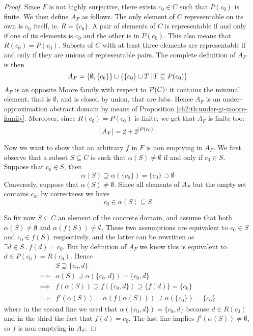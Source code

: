 \begin{proof}
	Since $F$ is not highly surjective, there exists $c_0 \in C$ such that $P(c_0)$ is finite. We then define $A_F$ as follows.
	The only element of $C$ representable on its own is $c_0$ itself, ie. $R = \{ c_0 \}$.
	A pair of elements of $C$ is representable if and only if one of its elements is $c_0$ and the other is in $P(c_0)$. This also means that $R(c_0) = P(c_0)$.
	Subsets of $C$ with at least three elements are representable if and only if they are unions of representable pairs.
	The complete definition of $A_F$ is then
	\[
	A_F = \{ \emptyset, \{ c_0 \} \} \cup \{ \{ c_0 \} \cup T \,\vert\, T \subseteq P(c_0) \}
	\]
	$A_F$ is an opposite Moore family with respect to $\mathcal{P}(C)$: it contains the minimal element, that is $\emptyset$, and is closed by union, that are lubs. Hence $A_F$ is an under-approximation abstract domain by means of Proposition \ref{ch2:th:under-gi-moore-family}.
	Moreover, since $R(c_0) = P(c_0)$ is finite, we get that $A_F$ is finite too:
	\[
	\lvert A_F\rvert = 2 + 2^{\lvert P(c_0)\rvert}
	\]

	Now we want to show that an arbitrary $f$ in $F$ is non emptying in $A_F$.
	We first observe that a subset $S \subseteq C$ is such that $\alpha(S) \neq \emptyset$ if and only if $c_0 \in S$. Suppose that $c_0 \in S$, then
	\[
	\alpha(S) \supseteq \alpha(\{ c_0 \}) = \{ c_0 \} \supset \emptyset
	\]
	Conversely, suppose that $\alpha(S) \neq \emptyset$. Since all elements of $A_F$ but the empty set contains $c_0$, by correctness we have
	\[
	c_0 \in \alpha(S) \subseteq S
	\]

	So fix now $S \subseteq C$ an element of the concrete domain, and assume that both $\alpha(S) \neq \emptyset$ and $\alpha(f(S)) \neq \emptyset$.
	These two assumptions are equivalent to $c_0 \in S$ and $c_0 \in f(S)$ respectively, and the latter can be rewritten as $\exists d \in S\ .\ f(d) = c_0$. But by definition of $A_F$ we know this is equivalent to $d \in P(c_0) = R(c_0)$.
	Hence
	\begin{align*}
		&S \supseteq \{ c_0, d \} \\
		\implies& \alpha(S) \supseteq \alpha(\{ c_0, d \}) = \{ c_0, d \} \\
		\implies& f(\alpha(S)) \supseteq f(\{ c_0, d \}) \supseteq \{ f(d) \} = \{ c_0 \} \\
		\implies& f^{\flat}(\alpha(S)) = \alpha(f(\alpha(S))) \supseteq \alpha(\{ c_0 \}) = \{ c_0 \}
	\end{align*}
	where in the second line we used that $\alpha(\{ c_0, d \}) = \{ c_0, d \}$ because $d \in R(c_0)$ and in the third the fact that $f(d) = c_0$.
	The last line implies $f^{\flat}(\alpha(S)) \neq \emptyset$, so $f$ is non emptying in $A_F$.
\end{proof}

